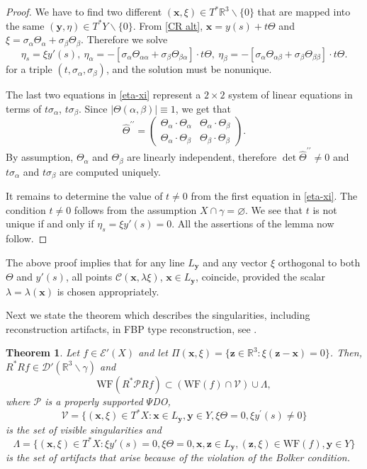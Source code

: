 \documentclass[11pt]{article}
\newcommand{\be}{\begin{equation}}
\newcommand{\ee}{\end{equation}}
\newcommand{\cC}{\mathcal C}
\newcommand{\WF}{\mathrm{WF}}
\newcommand{\br}{\mathbb{R}}
\newcommand{\bt}{\beta}
\newcommand{\al}{\alpha}
\newcommand{\la}{\lambda}
\newcommand{\ga}{\gamma}
\numberwithin{equation}{section}
\newcommand{\vy}{\mathbf{y}}
\newcommand{\vx}{\mathbf{x}}
\newcommand{\vz}{\mathbf{z}}
\newtheorem{theorem}{Theorem}[section]
\theoremstyle{definition}
\begin{document}
\begin{proof}
We have to find two different $(\vx,\xi)\in T^*\br^3\backslash \{0\}$ that are mapped into the same $(\vy,\eta)\in T^*Y\backslash \{0\}$. From \eqref{CR alt}, $\vx=y(s)+t\Theta$ and $\xi=\sigma_\al \Theta_\al + \sigma_\bt\Theta_\bt$. Therefore we solve
\be\label{eta-xi}
\eta_s=\xi y'(s),\ \eta_\al=-[\sigma_\al  \Theta_{\al\al} + \sigma_\bt\Theta_{\bt\al}]\cdot t\Theta,\
\eta_\bt=-[\sigma_\al  \Theta_{\al\bt} + \sigma_\bt\Theta_{\bt\bt}]\cdot t\Theta.
\ee
for a triple $(t,\sigma_\al, \sigma_\bt)$, and the solution must be nonunique.

The last two equations in \eqref{eta-xi} represent a $2\times2$ system of linear equations in terms of  $t\sigma_\al$, $t\sigma_\bt$. Since $|\Theta(\al,\bt)|\equiv1$, we get that 
\be
\hat\Theta^{\prime\prime}=\begin{pmatrix} \Theta_\al\cdot\Theta_\al & \Theta_\al\cdot\Theta_\bt\\
\Theta_\al\cdot\Theta_\bt & \Theta_\bt\cdot\Theta_\bt
\end{pmatrix}.
\ee
By assumption, $\Theta_\al$ and $\Theta_\bt$ are linearly independent, therefore $\det\hat\Theta^{\prime\prime}\neq0$ and $t\sigma_\al$ and $t\sigma_\bt$ are computed uniquely.

It remains to determine the value of $t\not=0$ from the first equation in \eqref{eta-xi}.
The condition $t\neq0$ follows from the assumption $X\cap\ga=\varnothing$. We see that $t$ is not unique if and only if $\eta_s=\xi y'(s)=0$. All the assertions of the lemma now  follow. 
\end{proof}

The above proof implies that for any line $L_{\vy}$ and any vector $\xi$ orthogonal to both $\Theta$ and $y'(s)$, all points $\cC(\vx,\la\xi)$, $\vx\in L_{\vy}$, coincide, provided the scalar $\la=\la(\vx)$ is chosen appropriately.

Next we state the theorem which describes the singularities, including reconstruction artifacts, in FBP type reconstruction, see \cite{gruhl1, kat7, flu}.

\begin{theorem}
\label{lin_art}
Let $f \in \mathcal{E}'(X)$ and let $\Pi(\vx,\xi) = \{\vz \in \br^3 : \xi(\vz - \vx) = 0\}$. Then, $R^*Rf \in \mathcal{D}'(\br^3\backslash \gamma)$ and
\be
\WF(R^* \mathcal{P}Rf) \subset (\WF(f) \cap \mathcal{V}) \cup \Lambda,
\ee
where $\mathcal{P}$ is a properly supported $\Psi$DO, 
\be
\mathcal{V} = \{ (\vx,\xi) \in T^*X: \vx \in L_{\vy}, \vy \in Y, \xi \Theta = 0,\xi y^\prime(s)\not=0\}
\ee
is the set of visible singularities and
\be
\label{lambda}
\Lambda = \{ (\vx,\xi) \in T^*X : \xi y'(s)=0, \xi \Theta=0, \vx,\vz \in L_{\vy}, (\vz, \xi) \in \WF(f),\vy\in Y\}
\ee
is the set of artifacts that arise because of the violation of the Bolker condition.
\end{theorem}
\end{document}
